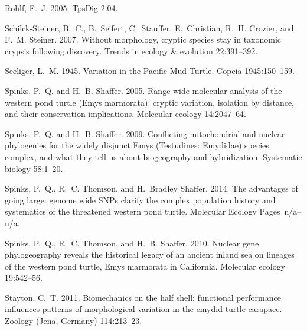 \documentclass[12pt,letterpaper]{article}
\begin{document}
\begin{thebibliography}{77}
    Rohlf, F.~J. 2005. {TpsDig 2.04}.

    Schilck-Steiner, B.~C., B.~Seifert, C.~Stauffer, E.~Christian, R.~H. Crozier,
    and F.~M. Steiner. 2007. {Without morphology, cryptic species stay in
    taxonomic crypsis following discovery}. Trends in ecology \& evolution
    22:391--392.

    Seeliger, L.~M. 1945. {Variation in the Pacific Mud Turtle}. Copeia
    1945:150--159.

    Spinks, P.~Q. and H.~B. Shaffer. 2005. {Range-wide molecular analysis of the
      western pond turtle (Emys marmorata): cryptic variation, isolation by
    distance, and their conservation implications.} Molecular ecology
    14:2047--64.

    Spinks, P.~Q. and H.~B. Shaffer. 2009. {Conflicting mitochondrial and nuclear
      phylogenies for the widely disjunct Emys (Testudines: Emydidae) species
    complex, and what they tell us about biogeography and hybridization.}
    Systematic biology 58:1--20.

    Spinks, P.~Q., R.~C. Thomson, and H.~{Bradley Shaffer}. 2014. {The advantages
      of going large: genome wide SNPs clarify the complex population history and
    systematics of the threatened western pond turtle}. Molecular Ecology
    Pages~n/a--n/a.

    Spinks, P.~Q., R.~C. Thomson, and H.~B. Shaffer. 2010. {Nuclear gene
      phylogeography reveals the historical legacy of an ancient inland sea on
    lineages of the western pond turtle, Emys marmorata in California.} Molecular
    ecology 19:542--56.

    Stayton, C.~T. 2011. {Biomechanics on the half shell: functional performance
      influences patterns of morphological variation in the emydid turtle
    carapace.} Zoology (Jena, Germany) 114:213--23.


\end{thebibliography}
\end{document}
